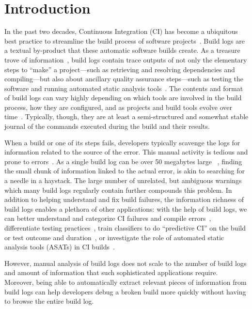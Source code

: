 \section{Introduction}
\label{sec:introduction}
In the past two decades, Continuous Integration (CI) has become a
ubiquitous best practice to streamline the build process of software
projects~\citep{hilton2016usage,beller2017oops,staahl2014modeling}.
Build logs are a textual by-product that these automatic software
builds create.
As a treasure trove of information~\citep{meyer},
build logs contain trace outputs of not only the elementary steps to
``make'' a project---such as retrieving and resolving dependencies and
compiling---but also about ancillary quality assurance steps---such as
testing the software and running automated static analysis
tools~\citep{beller2017oops}.
The
contents and format of build logs can vary highly depending on which tools
are involved in the build process, how they are
configured, and as projects and build tools evolve over
time~\citep{staahl2014modeling}.
Typically, though, they are at least a semi-structured and
somewhat stable journal of the commands executed during the build and
their results.

When a build or one of its steps fails, developers typically scavenge
the logs for information related to the source of the error.
This
manual activity is tedious and prone to
errors~\citep{santolucito2018statically}.
As a single build log can be
over 50 megabytes large~\citep{beller2017oops} , finding the small chunk
of information linked to the actual error, is akin to
searching for a needle in a haystack.
The large number of unrelated, but ambiguous
warnings which many build
logs regularly contain further compounds this problem.
In addition to helping
understand and fix build failures, the information richness of build
logs enables a plethora of other applications: with the help of build
logs, we can better understand and categorize CI failures and compile
errors~\citep{islam2017insights,seo2014programmers}, differentiate
testing practices~\citep{orellana2017differences,vassallo2017a-tale},
train classifiers to do ``predictive CI'' on the build or test outcome
and
duration~\citep{ni2017cost,bisong2017built,haghighatkhah2018test,
machalica2019predictive},
or investigate the role of automated static analysis tools (ASATs)
in CI
builds~\citep{zampetti2017open}.

However, manual analysis of build logs does not
scale to the number of build logs and amount of information that such
sophisticated applications require.
Moreover, being able to
automatically extract relevant pieces of information from build logs
can help
developers debug a broken build more quickly without having to browse
the entire build log.

